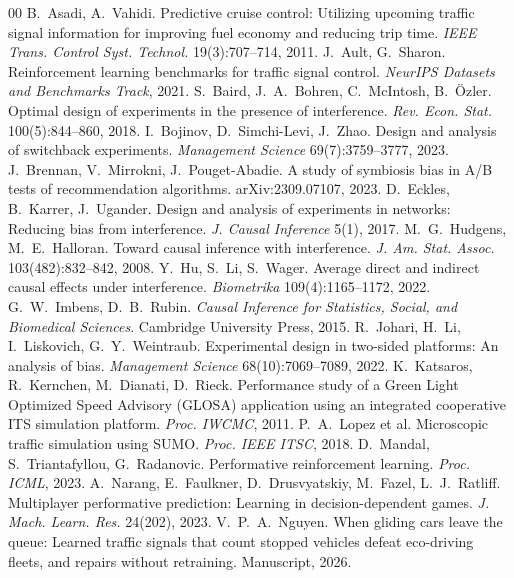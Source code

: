 \begin{thebibliography}{00}\footnotesize
{} B.~Asadi, A.~Vahidi. Predictive cruise control: Utilizing upcoming traffic signal information for improving fuel economy and reducing trip time. \emph{IEEE Trans. Control Syst. Technol.} 19(3):707--714, 2011.
 J.~Ault, G.~Sharon. Reinforcement learning benchmarks for traffic signal control. \emph{NeurIPS Datasets and Benchmarks Track}, 2021.
 S.~Baird, J.~A.~Bohren, C.~McIntosh, B.~\"Ozler. Optimal design of experiments in the presence of interference. \emph{Rev. Econ. Stat.} 100(5):844--860, 2018.
 I.~Bojinov, D.~Simchi-Levi, J.~Zhao. Design and analysis of switchback experiments. \emph{Management Science} 69(7):3759--3777, 2023.
 J.~Brennan, V.~Mirrokni, J.~Pouget-Abadie. A study of symbiosis bias in A/B tests of recommendation algorithms. arXiv:2309.07107, 2023.
 D.~Eckles, B.~Karrer, J.~Ugander. Design and analysis of experiments in networks: Reducing bias from interference. \emph{J. Causal Inference} 5(1), 2017.
 M.~G.~Hudgens, M.~E.~Halloran. Toward causal inference with interference. \emph{J. Am. Stat. Assoc.} 103(482):832--842, 2008.
 Y.~Hu, S.~Li, S.~Wager. Average direct and indirect causal effects under interference. \emph{Biometrika} 109(4):1165--1172, 2022.
 G.~W.~Imbens, D.~B.~Rubin. \emph{Causal Inference for Statistics, Social, and Biomedical Sciences}. Cambridge University Press, 2015.
 R.~Johari, H.~Li, I.~Liskovich, G.~Y.~Weintraub. Experimental design in two-sided platforms: An analysis of bias. \emph{Management Science} 68(10):7069--7089, 2022.
 K.~Katsaros, R.~Kernchen, M.~Dianati, D.~Rieck. Performance study of a Green Light Optimized Speed Advisory (GLOSA) application using an integrated cooperative ITS simulation platform. \emph{Proc. IWCMC}, 2011.
 P.~A.~Lopez et al. Microscopic traffic simulation using SUMO. \emph{Proc. IEEE ITSC}, 2018.
 D.~Mandal, S.~Triantafyllou, G.~Radanovic. Performative reinforcement learning. \emph{Proc. ICML}, 2023.
 A.~Narang, E.~Faulkner, D.~Drusvyatskiy, M.~Fazel, L.~J.~Ratliff. Multiplayer performative prediction: Learning in decision-dependent games. \emph{J. Mach. Learn. Res.} 24(202), 2023.
 V.~P.~A.~Nguyen. When gliding cars leave the queue: Learned traffic signals that count stopped vehicles defeat eco-driving fleets, and repairs without retraining. Manuscript, 2026.

\end{thebibliography}
